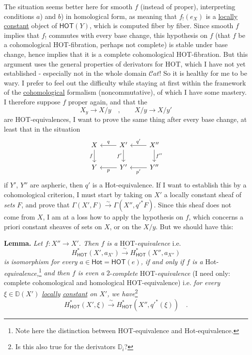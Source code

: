 \documentclass[11pt]{article}
\newcommand{\printedpage}[1]{\marginpar{\footnotesize p.~#1}}
\newcommand{\msp}[1]{\marginpar{\footnotesize [#1]}}
\newcommand{\HOT}{\textsf{HOT}}
\newcommand{\Hot}{\textsf{Hot}}
\newcommand{\Cat}{\mathcal{C}at}
\newcommand{\DD}{\mathbb{D}}
\begin{document}
The situation seems better here for smooth $f$ (instead of proper), interpreting conditions $a$) and $b$) in homological form, as meaning that $f_!(e_X)$ is a \underline{locally} \underline{constant} object of $\mathsf{HOT}(Y)$, which is computed fiber by fiber. Since smooth $f$ implies that $f_!$ commutes with every base change, this hypothesis on $f$ (that $f$ be a cohomological \HOT-fibration, perhaps not complete) is stable under base change, hence implies that it is a complete cohomological \HOT-fibration. But this argument uses the general properties of derivators for \HOT, which I have not yet established - especially not in the whole domain $\Cat$! So it is healthy for me to be wary. I prefer to feel out the difficulty while staying at first within the framework of the \underline{cohomological} formalism (noncommutative), of which I have some mastery. I therefore suppose $f$ proper again, and that the %
\[ X_y \longrightarrow X/y \quad , \qquad X/y \longrightarrow X/y' \]
\msp{page 109}
are \HOT-equivalences, I want to prove the same thing after every base change, at least that in the situation
\[
\begin{tikzcd}
X \arrow[r, leftarrow, "q"] \arrow[d, "f"'] & X' \arrow[r, leftarrow, "q'"] \arrow[d, "f'"'] & X'' \arrow[d, "f''"] \\
Y \arrow[r, leftarrow, "p"'] & Y' \arrow[r, leftarrow, "p'"'] & Y''
\end{tikzcd}
\]
\printedpage{65}
if $Y'$, $Y''$ are aspheric, then $q'$ is a \Hot-equivalence. If I want to establish this by a cohomological criterion, I must start by taking on $X'$ a locally constant sheaf of \textit{sets} $F$, and prove that $\Gamma(X',F) \overset{\sim}{\to} \Gamma(X'',{q'}^{*}F)$. Since this sheaf does not come from $X$, I am at a loss how to apply the hypothesis on $f$, which concerns a priori constant sheaves of sets on $X$, or on the $X/y$. But we should have this:

\textbf{Lemma.} \textit{Let $f : X'' \to X'$. Then $f$ is a} \HOT-\textit{equivalence} i.e.
\[ H^{*}_{\mathsf{HOT}}(X', a_{X'}) \xrightarrow{\ \sim\ } H^{*}_{\mathsf{HOT}}(X'', a_{X''}) \]
\textit{is} \textit{isomorphism for every $a \in \mathsf{Hot} = \mathsf{HOT}(e)$, if and only if $f$ is a} \Hot-\textit{equivalence,}\footnote[56]{Note here the distinction between \HOT-equivalence and \Hot-equivalence.} \textit{and then $f$ is even a} $2$-\textit{complete} \HOT-\textit{equivalence} (I need only: complete cohomological and homological \HOT-equivalence) i.e. \textit{for every $\xi \in \DD(X')$ \underline{locally} \underline{constant} on $X'$, we have}\footnote[57]{Is this also true for the derivators $\DD_i$?}
\[ H^{*}_{\mathsf{HOT}}(X',\xi) \xrightarrow{\ \sim\ } H^{*}_{\mathsf{HOT}}(X'',{q'}^{*}(\xi)) \quad . \]
\msp{page 110}
\end{document}
